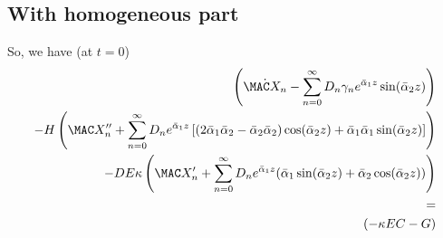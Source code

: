 \documentclass[11pt]{article}
\newcommand{\ABA}{\bar{\alpha}_1}
\newcommand{\ABB}{\bar{\alpha}_2}
\begin{document}
\subsection{With homogeneous part}
So, we have (at $t=0$)
\begin{equation}\begin{aligned}
	\left( \dot{\MAC X_n} - \sum_{n=0}^{\infty} D_n \gamma_n e^{\ABA z} \sin(\ABB z) \right) \\
	 - H \left( \MAC X_n''  + \sum_{n=0}^{\infty} D_n e^{\ABA z} \left[ (2 \ABA \ABB - \ABB \ABB) \cos (\ABB z) + \ABA \ABA \sin (\ABB z) \right] \right) \\
	 - DE \kappa \left( \MAC X_n'   + \sum_{n=0}^{\infty} D_n e^{\ABA z} ( \ABA \sin (\ABB z) + \ABB \cos (\ABB z) ) \right) \\
	  = \\
	  (- \kappa EC -G) \\
\end{aligned} \end{equation}
\end{document}
